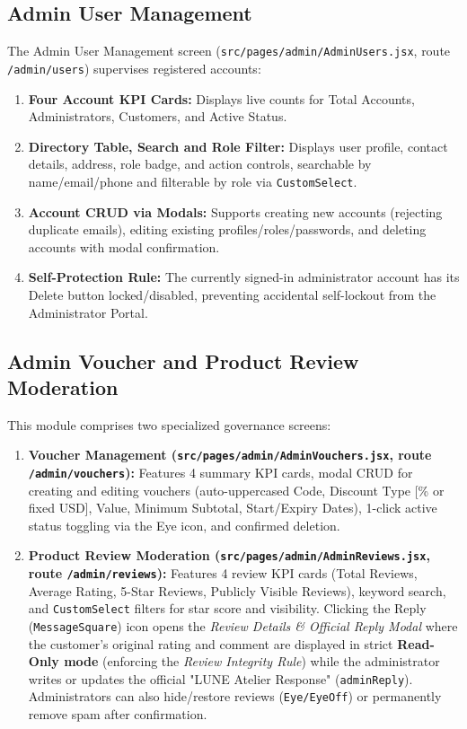 \documentclass[12pt,a4paper,oneside]{report}
\begin{document}
\subsection{Admin User Management}
The Admin User Management screen (\texttt{src/pages/admin/AdminUsers.jsx}, route \texttt{/admin/users}) supervises registered accounts:
\begin{enumerate}[leftmargin=1.2cm]
    \item \textbf{Four Account KPI Cards:} Displays live counts for Total Accounts, Administrators, Customers, and Active Status.
    \item \textbf{Directory Table, Search and Role Filter:} Displays user profile, contact details, address, role badge, and action controls, searchable by name/email/phone and filterable by role via \texttt{CustomSelect}.
    \item \textbf{Account CRUD via Modals:} Supports creating new accounts (rejecting duplicate emails), editing existing profiles/roles/passwords, and deleting accounts with modal confirmation.
    \item \textbf{Self-Protection Rule:} The currently signed-in administrator account has its Delete button locked/disabled, preventing accidental self-lockout from the Administrator Portal.
\end{enumerate}

\subsection{Admin Voucher and Product Review Moderation}
This module comprises two specialized governance screens:
\begin{enumerate}[leftmargin=1.2cm]
    \item \textbf{Voucher Management (\texttt{src/pages/admin/AdminVouchers.jsx}, route \texttt{/admin/vouchers}):} Features 4 summary KPI cards, modal CRUD for creating and editing vouchers (auto-uppercased Code, Discount Type [\% or fixed USD], Value, Minimum Subtotal, Start/Expiry Dates), 1-click active status toggling via the Eye icon, and confirmed deletion.
    \item \textbf{Product Review Moderation (\texttt{src/pages/admin/AdminReviews.jsx}, route \texttt{/admin/reviews}):} Features 4 review KPI cards (Total Reviews, Average Rating, 5-Star Reviews, Publicly Visible Reviews), keyword search, and \texttt{CustomSelect} filters for star score and visibility. Clicking the Reply (\texttt{MessageSquare}) icon opens the \textit{Review Details \& Official Reply Modal} where the customer's original rating and comment are displayed in strict \textbf{Read-Only mode} (enforcing the \textit{Review Integrity Rule}) while the administrator writes or updates the official "LUNE Atelier Response" (\texttt{adminReply}). Administrators can also hide/restore reviews (\texttt{Eye/EyeOff}) or permanently remove spam after confirmation.
\end{enumerate}
\end{document}
